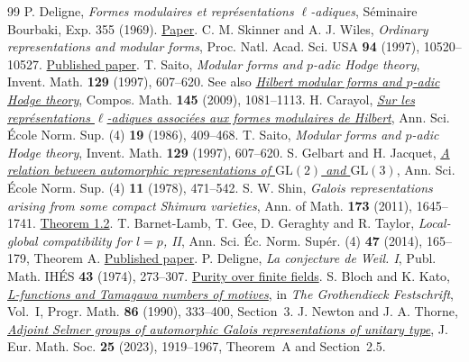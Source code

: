 \documentclass[a4paper,11pt]{article}
\theoremstyle{definition}
\theoremstyle{remark}
\numberwithin{equation}{section}
\begin{document}
\begin{thebibliography}{99}
 P. Deligne, \emph{Formes modulaires et repr\'esentations \(\ell\)-adiques}, S\'eminaire Bourbaki, Exp. 355 (1969). \href{https://www.numdam.org/item/SB_1968-1969__11__139_0.pdf}{Paper}.
 C. M. Skinner and A. J. Wiles, \emph{Ordinary representations and modular forms}, Proc. Natl. Acad. Sci. USA \textbf{94} (1997), 10520--10527. \href{https://doi.org/10.1073/pnas.94.20.10520}{Published paper}.
 T. Saito, \emph{Modular forms and \(p\)-adic Hodge theory}, Invent. Math. \textbf{129} (1997), 607--620. See also \href{https://www.ms.u-tokyo.ac.jp/~t-saito/pp/h.pdf}{\emph{Hilbert modular forms and \(p\)-adic Hodge theory}}, Compos. Math. \textbf{145} (2009), 1081--1113.
 H. Carayol, \href{https://www.numdam.org/articles/10.24033/asens.1512/}{\emph{Sur les repr\'esentations \(\ell\)-adiques associ\'ees aux formes modulaires de Hilbert}}, Ann. Sci. \'Ecole Norm. Sup. (4) \textbf{19} (1986), 409--468. T. Saito, \emph{Modular forms and \(p\)-adic Hodge theory}, Invent. Math. \textbf{129} (1997), 607--620.
 S. Gelbart and H. Jacquet, \href{https://www.numdam.org/item/ASENS_1978_4_11_4_471_0/}{\emph{A relation between automorphic representations of \(\mathrm{GL}(2)\) and \(\mathrm{GL}(3)\)}}, Ann. Sci. \'Ecole Norm. Sup. (4) \textbf{11} (1978), 471--542.
 S. W. Shin, \emph{Galois representations arising from some compact Shimura varieties}, Ann. of Math. \textbf{173} (2011), 1645--1741. \href{https://annals.math.princeton.edu/2011/173-3/p09}{Theorem 1.2}.
 T. Barnet-Lamb, T. Gee, D. Geraghty and R. Taylor, \emph{Local-global compatibility for \(l=p\), II}, Ann. Sci. \'Ec. Norm. Sup\'er. (4) \textbf{47} (2014), 165--179, Theorem A. \href{https://www.numdam.org/articles/10.24033/asens.2212/}{Published paper}.
 P. Deligne, \emph{La conjecture de Weil. I}, Publ. Math. IH\'ES \textbf{43} (1974), 273--307. \href{https://www.numdam.org/item/PMIHES_1974__43__273_0/}{Purity over finite fields}.
 S. Bloch and K. Kato, \href{https://virtualmath1.stanford.edu/~conrad/BSDseminar/refs/BKTamagawa.pdf}{\emph{L-functions and Tamagawa numbers of motives}}, in \emph{The Grothendieck Festschrift}, Vol.~I, Progr. Math. \textbf{86} (1990), 333--400, Section~3.
 J. Newton and J. A. Thorne, \href{https://arxiv.org/pdf/1912.11265}{\emph{Adjoint Selmer groups of automorphic Galois representations of unitary type}}, J. Eur. Math. Soc. \textbf{25} (2023), 1919--1967, Theorem~A and Section~2.5.

\end{thebibliography}
\end{document}
